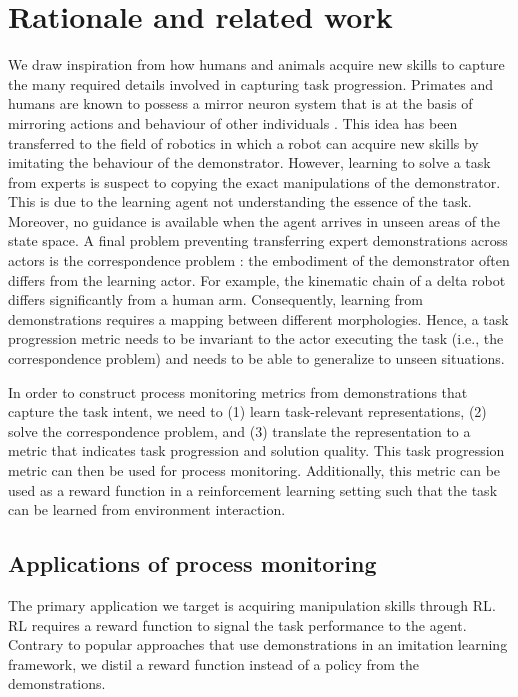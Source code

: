 \documentclass[\home/main.tex]{subfiles}
\begin{document}
\section{Rationale and related work} \label{sec:rewards_rationale}

We draw inspiration from how humans and animals acquire new skills to capture the many required details involved in capturing task progression. Primates and humans are known to possess a mirror neuron system that is at the basis of mirroring actions and behaviour of other individuals \autocite{Gallese2004}. This idea has been transferred to the field of robotics \autocite{Argall2009} in which a robot can acquire new skills by imitating the behaviour of the demonstrator. However, learning to solve a task from experts is suspect to copying the exact manipulations of the demonstrator. This is due to the learning agent not understanding the essence of the task. Moreover, no guidance is available when the agent arrives in unseen areas of the state space. A final problem preventing transferring expert demonstrations across actors is the correspondence problem \autocite{Nehavic2002}: the embodiment of the demonstrator often differs from the learning actor. For example, the kinematic chain of a delta robot differs significantly from a human arm. Consequently, learning from demonstrations requires a mapping between different morphologies. Hence, a task progression metric needs to be invariant to the actor executing the task (i.e., the correspondence problem) and needs to be able to generalize to unseen situations.

In order to construct process monitoring metrics from demonstrations that capture the task intent, we need to (1) learn task-relevant representations, (2) solve the correspondence problem, and (3) translate the representation to a metric that indicates task progression and solution quality. This task progression metric can then be used for process monitoring. Additionally, this metric can be used as a reward function in a reinforcement learning setting such that the task can be learned from environment interaction.

\subsection{Applications of process monitoring}
The primary application we target is acquiring manipulation skills through \gls{RL}. \gls{RL} requires a reward function to signal the task performance to the agent. Contrary to popular approaches that use demonstrations in an imitation learning framework, we distil a reward function instead of a policy from the demonstrations.
\end{document}
